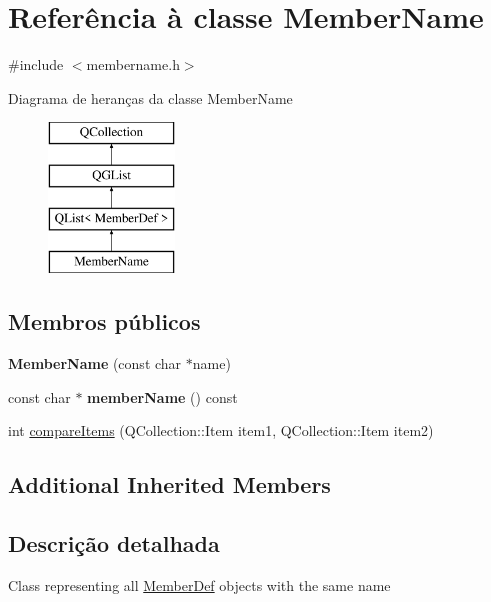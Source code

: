 \hypertarget{class_member_name}{\section{Referência à classe Member\-Name}
\label{class_member_name}
}


{\ttfamily \#include $<$membername.\-h$>$}

Diagrama de heranças da classe Member\-Name\begin{figure}[H]
\begin{center}
\leavevmode
\includegraphics[height=4.000000cm]{class_member_name}
\end{center}
\end{figure}
\subsection*{Membros públicos}
\begin{DoxyCompactItemize}
\item 
\hypertarget{class_member_name_a38522b6be0668457bb1cf89a3bc9fc58}{{\bfseries Member\-Name} (const char $\ast$name)}\label{class_member_name_a38522b6be0668457bb1cf89a3bc9fc58}

\item 
\hypertarget{class_member_name_a95981d16e8c133c83b27e3d5cac18f36}{const char $\ast$ {\bfseries member\-Name} () const }\label{class_member_name_a95981d16e8c133c83b27e3d5cac18f36}

\item 
int \hyperlink{class_member_name_a219450accf048597ffc7113ecde4c402}{compare\-Items} (Q\-Collection\-::\-Item item1, Q\-Collection\-::\-Item item2)
\end{DoxyCompactItemize}
\subsection*{Additional Inherited Members}


\subsection{Descrição detalhada}
Class representing all \hyperlink{class_member_def}{Member\-Def} objects with the same name 


